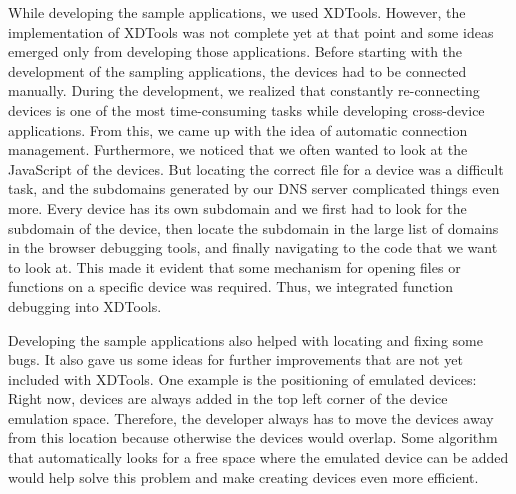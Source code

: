While developing the sample applications, we used XDTools. However, the implementation of XDTools was not complete yet at that point and some ideas emerged only from developing those applications. Before starting with the development of the sampling applications, the devices had to be connected manually. During the development, we realized that constantly re-connecting devices is one of the most time-consuming tasks while developing cross-device applications. From this, we came up with the idea of automatic connection management. Furthermore, we noticed that we often wanted to look at the JavaScript of the devices. But locating the correct file for a device was a difficult task, and the subdomains generated by our DNS server complicated things even more. Every device has its own subdomain and we first had to look for the subdomain of the device, then locate the subdomain in the large list of domains in the browser debugging tools, and finally navigating to the code that we want to look at. This made it evident that some mechanism for opening files or functions on a specific device was required. Thus, we integrated function debugging into XDTools. 

Developing the sample applications also helped with locating and fixing some bugs. It also gave us some ideas for further improvements that are not yet included with XDTools. One example is the positioning of emulated devices: Right now, devices are always added in the top left corner of the device emulation space. Therefore, the developer always has to move the devices away from this location because otherwise the devices would overlap. Some algorithm that automatically looks for a free space where the emulated device can be added would help solve this problem and make creating devices even more efficient.